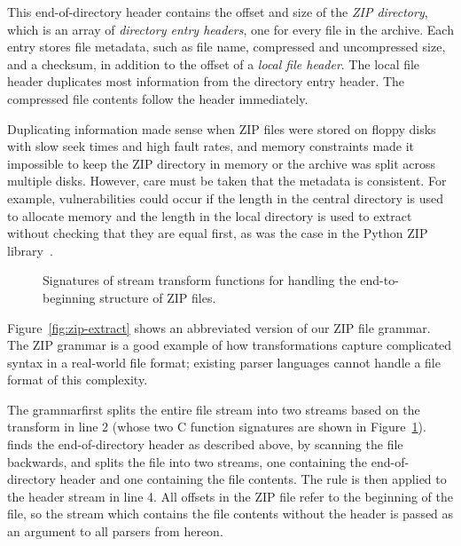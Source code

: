  This end-of-directory
header contains the offset and size of the \emph{ZIP directory}, which
is an array of \emph{directory entry headers}, one for every file
in the archive.  Each entry stores file metadata, such as file name,
compressed and uncompressed size, and a checksum, in addition to the
offset of a \emph{local file header}. The local file header duplicates
most information from the directory entry header. The compressed file
contents follow the header immediately.



Duplicating information made sense when ZIP files were stored on floppy
disks with slow seek times and high fault rates, and memory constraints
made it impossible to keep the ZIP directory in memory or the archive
was split across multiple disks.  However, care must be taken that the
metadata is consistent. For example, vulnerabilities could occur if
the length in the central directory is used to allocate memory and the
length in the local directory is used to extract without checking that
they are equal first, as was the case in the Python ZIP
library~\cite{cve-2012-7338}.

\begin{figure}[tb]
\smaller[0.5]

\caption{Signatures of stream transform functions for handling the
end-to-beginning structure of ZIP files.}
\label{fig:zip-eod-xform}
\end{figure}

Figure~\ref{fig:zip-extract} shows an abbreviated version of our ZIP
file grammar.  The ZIP grammar is a good example of how transformations
capture complicated syntax in a real-world file format; existing parser
languages cannot handle a file format of this complexity.

The  grammarfirst splits the entire file stream into two
streams based on the  transform in line 2
(whose two C function signatures are shown in
Figure~\ref{fig:zip-eod-xform}). 
finds the end-of-directory header as described above, by scanning the
file backwards, and splits the file into two streams, one containing
the end-of-directory header and one containing the file contents. The
 rule is then applied to the header stream in
line 4. All offsets in the ZIP file refer to the beginning of the
file, so the stream  which contains the file contents
without the header is passed as an argument to all parsers from
hereon. 

